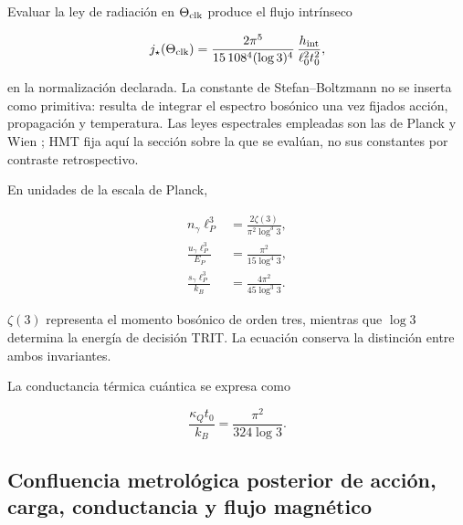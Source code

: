 Evaluar la ley de radiaci\'on en \(\Theta_{\rm clk}\) produce el flujo intr\'inseco

\begin{equation}
j_\star(\Theta_{\rm clk})
=\frac{2\pi^5}{15\,108^4(\log3)^4}\,
\frac{h_{\rm int}}{\ell_0^2t_0^2},
\label{p12-83-c13-s2:eq:stefan-hmt}
\end{equation}

en la normalizaci\'on declarada. La constante de Stefan--Boltzmann no se inserta como primitiva: resulta de integrar el espectro bos\'onico una vez fijados acci\'on, propagaci\'on y temperatura.
Las leyes espectrales empleadas son las de Planck y Wien \cite{rm:Planck,rm:Wien}; HMT fija aqu\'i la secci\'on sobre la que se eval\'uan, no sus constantes por contraste retrospectivo.

En unidades de la escala de Planck,

\begin{align}
n_\gamma\ell_P^3
&=\frac{2\zeta(3)}{\pi^2\log^3 3},
\label{p12-83-c13-s2:eq:photon-number}\\
\frac{u_\gamma\ell_P^3}{E_P}
&=\frac{\pi^2}{15\log^4 3},
\label{p12-83-c13-s2:eq:photon-energy}\\
\frac{s_\gamma\ell_P^3}{k_B}
&=\frac{4\pi^2}{45\log^3 3}.
\label{p12-83-c13-s2:eq:photon-entropy}
\end{align}

\(\zeta(3)\) representa el momento bos\'onico de orden tres, mientras que
\(\log3\) determina la energ\'ia de decisi\'on TRIT. La ecuaci\'on conserva la
distinci\'on entre ambos invariantes.

La conductancia t\'ermica cu\'antica se expresa como

\begin{equation}
\frac{\kappa_Qt_0}{k_B}=\frac{\pi^2}{324\log3}.
\label{p12-83-c13-s2:eq:thermal-conductance}
\end{equation}

\subsection{Confluencia metrológica posterior de acción, carga, conductancia y flujo magnético}

